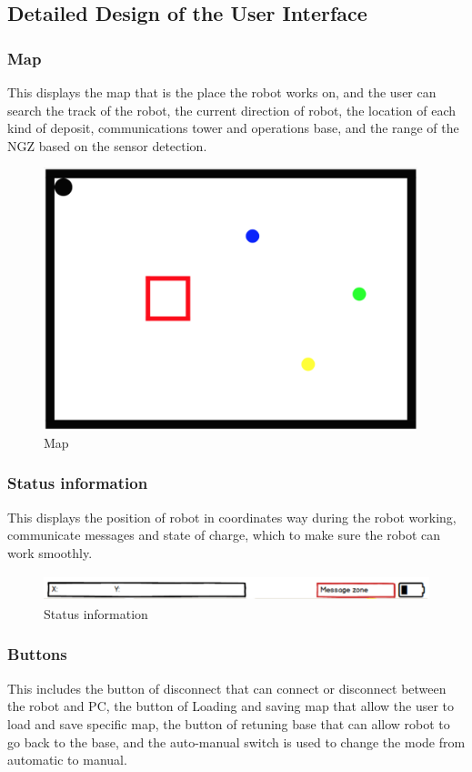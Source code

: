 \documentclass[11pt, a4paper]{article}
\begin{document}
\subsection{Detailed Design of the User Interface}
\subsubsection{Map}
This displays the map that is the place the robot works on, and the user can search the track of the robot, the current direction of robot, the location of each kind of deposit, communications tower and operations base, and the range of the NGZ based on the sensor detection.

\begin{figure}[H]
\centering
\includegraphics[height=3in]{map}
\caption[Map]{Map}
\end{figure}

\subsubsection{Status information}
This displays the position of robot in coordinates way during the robot working, communicate messages and state of charge, which to make sure the robot can work smoothly.

\begin{figure}[H]
\centering
\includegraphics[height=0.3in]{SI}
\caption[Status information]{Status information}
\end{figure}
\newpage

\subsubsection{Buttons}
This includes the button of disconnect that can connect or disconnect between the robot and PC, the button of Loading and saving map that allow the user to load and save specific map, the button of retuning base that can allow robot to go back to the base, and the auto-manual switch is used to change the mode from automatic to manual.
\end{document}
